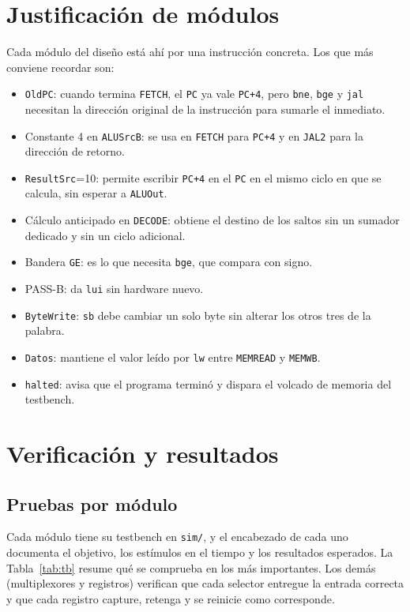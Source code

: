 \documentclass[conference]{IEEEtran}
\newcommand{\cod}[1]{\texttt{\small #1}}
\begin{document}
\section{Justificación de módulos}
Cada módulo del diseño está ahí por una instrucción concreta. Los que más conviene recordar son:
\begin{itemize}
\item \cod{OldPC}: cuando termina \cod{FETCH}, el \cod{PC} ya vale \cod{PC+4}, pero \cod{bne}, \cod{bge} y \cod{jal} necesitan la dirección original de la instrucción para sumarle el inmediato.
\item Constante 4 en \cod{ALUSrcB}: se usa en \cod{FETCH} para \cod{PC+4} y en \cod{JAL2} para la dirección de retorno.
\item \cod{ResultSrc}=10: permite escribir \cod{PC+4} en el \cod{PC} en el mismo ciclo en que se calcula, sin esperar a \cod{ALUOut}.
\item Cálculo anticipado en \cod{DECODE}: obtiene el destino de los saltos sin un sumador dedicado y sin un ciclo adicional.
\item Bandera \cod{GE}: es lo que necesita \cod{bge}, que compara con signo.
\item PASS-B: da \cod{lui} sin hardware nuevo.
\item \cod{ByteWrite}: \cod{sb} debe cambiar un solo byte sin alterar los otros tres de la palabra.
\item \cod{Datos}: mantiene el valor leído por \cod{lw} entre \cod{MEMREAD} y \cod{MEMWB}.
\item \cod{halted}: avisa que el programa terminó y dispara el volcado de memoria del testbench.
\end{itemize}

\section{Verificación y resultados}
\subsection{Pruebas por módulo}
Cada módulo tiene su testbench en \cod{sim/}, y el encabezado de cada uno documenta el objetivo, los estímulos en el tiempo y los resultados esperados. La Tabla~\ref{tab:tb} resume qué se comprueba en los más importantes. Los demás (multiplexores y registros) verifican que cada selector entregue la entrada correcta y que cada registro capture, retenga y se reinicie como corresponde.
\end{document}
